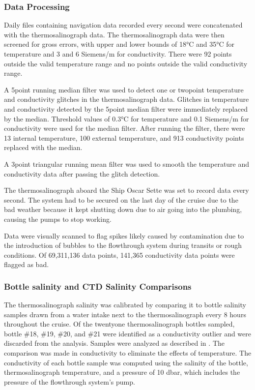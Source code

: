 \documentclass[a4paper,10pt,english,openany,oneside]{sphinxmanual}
\begin{document}
\subsubsection{Data Processing}
\label{\detokenize{4_section:data-processing}}
\sphinxAtStartPar
Daily files containing navigation data recorded every second were concatenated
with the thermosalinograph data. The thermosalinograph data were then screened
for gross errors, with upper and lower bounds of 18°C and 35°C for
temperature and 3 and 6 Siemens/m for conductivity. There were 92 points
outside the valid temperature range and no points outside the valid
conductivity range.

\sphinxAtStartPar
A 5\sphinxhyphen{}point running median filter was used to detect one\sphinxhyphen{} or two\sphinxhyphen{}point
temperature and conductivity glitches in the thermosalinograph data. Glitches
in temperature and conductivity detected by the 5\sphinxhyphen{}point median filter were
immediately replaced by the median. Threshold values of 0.3°C for temperature
and 0.1 Siemens/m for conductivity were used for the median filter. After
running the filter, there were 13 internal temperature, 100 external
temperature, and 913 conductivity points replaced with the median.

\sphinxAtStartPar
A 3\sphinxhyphen{}point triangular running mean filter was used to smooth the temperature and
conductivity data after passing the glitch detection.

\sphinxAtStartPar
The thermosalinograph aboard the Ship Oscar Sette was set to record data every
second. The system had to be secured on the last day of the cruise due to the
bad weather because it kept shutting down due to air going into the plumbing,
causing the pumps to stop working.

\sphinxAtStartPar
Data were visually scanned to flag spikes likely caused by contamination due to
the introduction of bubbles to the flow\sphinxhyphen{}through system during transits or rough
conditions. Of 69,311,136 data points, 141,365 conductivity data points were
flagged as bad.


\subsubsection{Bottle salinity and CTD Salinity Comparisons}
\label{\detokenize{4_section:bottle-salinity-and-ctd-salinity-comparisons}}
\sphinxAtStartPar
The thermosalinograph salinity was calibrated by comparing it to bottle
salinity samples drawn from a water intake next to the thermosalinograph every
8 hours throughout the cruise. Of the twenty\sphinxhyphen{}one thermosalinograph bottles
sampled, bottle \#18, \#19, \#20, and \#21 were identified as a conductivity
outlier and were discarded from the analysis. Samples were analyzed as
described in {\hyperref[\detokenize{4_section:water-sampling-and-analysis}]{}}. The comparison
was made in conductivity to eliminate the effects of temperature. The
conductivity of each bottle sample was computed using the salinity of the
bottle, thermosalinograph temperature, and a pressure of 10 dbar, which
includes the pressure of the flow\sphinxhyphen{}through system’s pump.
\end{document}
